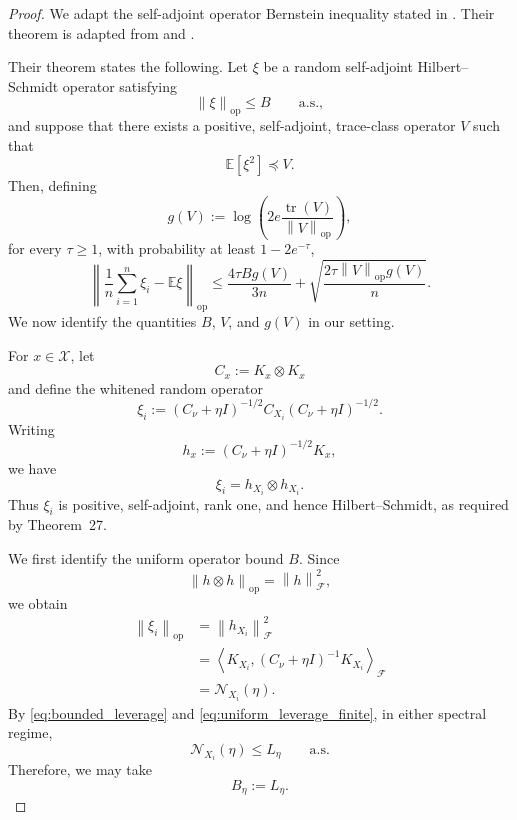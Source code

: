 \documentclass[11pt]{article}
\newcommand{\E}{\mathbb{E}}
\newcommand{\F}{\mathcal{F}}
\newcommand{\X}{\mathcal{X}}
\newcommand{\Ncal}{\mathcal{N}}
\newcommand{\op}{\mathrm{op}}
\newcommand{\tr}{\operatorname{tr}}
\newcommand{\norm}[1]{\left\lVert #1\right\rVert}
\newcommand{\preceqL}{\preceq}
\begin{document}
\begin{proof}
We adapt the self-adjoint operator Bernstein inequality stated in
\citet[Theorem~27]{fischer2020sobolev}. Their theorem is adapted from \cite{lincevher2020} and \cite{minsker2017extensions}.

Their theorem states the following.
Let $\xi$ be a random self-adjoint Hilbert--Schmidt operator satisfying
\[
    \norm{\xi}_{\op}\leq B
    \qquad\text{a.s.},
\]
and suppose that there exists a positive, self-adjoint, trace-class operator
$V$ such that
\[
    \E[\xi^2]\preceqL V.
\]
Then, defining
\[
    g(V)
    :=
    \log\!\left(
        2e\frac{\tr(V)}{\norm{V}_{\op}}
    \right),
\]
for every $\tau\geq1$, with probability at least $1-2e^{-\tau}$,
\begin{equation}
\label{eq:fischer_operator_bernstein}
    \left\|
        \frac1n\sum_{i=1}^n\xi_i-\E\xi
    \right\|_{\op}
    \leq
    \frac{4\tau B g(V)}{3n}
    +
    \sqrt{
        \frac{2\tau\norm{V}_{\op}g(V)}{n}
    }.
\end{equation}
We now identify the quantities $B$, $V$, and $g(V)$ in our setting.

For $x\in\X$, let
\[
    C_x:=K_x\otimes K_x
\]
and define the whitened random operator
\[
    \xi_i
    :=
    (C_\nu+\eta I)^{-1/2}
    C_{X_i}
    (C_\nu+\eta I)^{-1/2}.
\]
Writing
\[
    h_x:=(C_\nu+\eta I)^{-1/2}K_x,
\]
we have
\[
    \xi_i=h_{X_i}\otimes h_{X_i}.
\]
Thus $\xi_i$ is positive, self-adjoint, rank one, and hence
Hilbert--Schmidt, as required by Theorem~27.

We first identify the uniform operator bound $B$. Since
\[
    \norm{h\otimes h}_{\op}=\norm{h}_{\F}^2,
\]
we obtain
\begin{align*}
    \norm{\xi_i}_{\op}
    &=
    \norm{h_{X_i}}_{\F}^2 \\
    &=
    \left\langle
        K_{X_i},
        (C_\nu+\eta I)^{-1}K_{X_i}
    \right\rangle_{\F} \\
    &=
    \Ncal_{X_i}(\eta).
\end{align*}
By \eqref{eq:bounded_leverage} and \eqref{eq:uniform_leverage_finite}, in either spectral regime,
\[
    \Ncal_{X_i}(\eta)
    \leq
    L_\eta
    \qquad\text{a.s.}
\]
Therefore, we may take
\begin{equation}
\label{eq:bernstein_B_identification}
    B_\eta
    :=
    L_\eta.
\end{equation}


\end{proof}
\end{document}
